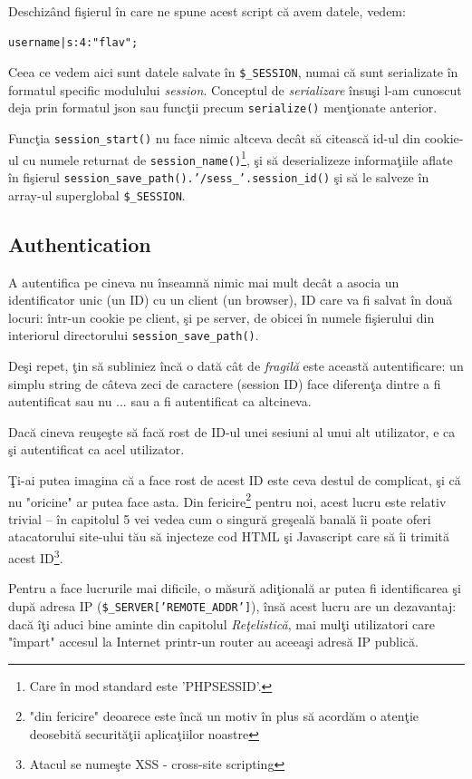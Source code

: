 Deschiz\^and fişierul \^in care ne spune acest script că avem datele, vedem:
\begin{verbatim}
username|s:4:"flav";
\end{verbatim}
Ceea ce vedem aici sunt datele salvate \^in \texttt{\$\_SESSION}, numai că
sunt serializate \^in formatul specific modulului \textit{session}. Conceptul
de \textsl{serializare} \^insuşi l-am cunoscut deja prin formatul json sau funcţii
precum \texttt{serialize()} menţionate anterior.

Funcţia \texttt{session\_start()} nu face nimic altceva dec\^at să citească id-ul
din cookie-ul cu numele returnat de \texttt{session\_name()}\footnote{Care \^in mod
standard este 'PHPSESSID'.}, şi să deserializeze informaţiile aflate \^in fişierul
\texttt{session\_save\_path().'/sess\_'.session\_id()}
şi să le salveze \^in
array-ul superglobal \texttt{\$\_SESSION}.

\subsection{Authentication}
A autentifica pe cineva nu înseamnă nimic mai mult decât a asocia
un identificator unic (un ID) cu un client (un browser), ID
care va fi salvat în două locuri: într-un cookie pe client, şi pe
server, de obicei în numele fişierului din interiorul directorului
\texttt{session\_save\_path()}.

Deşi repet, ţin să subliniez încă o dată cât de \textit{fragilă} este această
autentificare: un simplu string de câteva zeci de caractere
(session ID) face diferenţa dintre a fi autentificat sau nu ... sau
a fi autentificat ca altcineva.

Dacă cineva reuşeşte să facă rost de ID-ul unei sesiuni al unui
alt utilizator, e ca şi autentificat ca acel utilizator.

Ţi-ai putea imagina că a face rost de acest ID este ceva destul de
complicat, şi că nu "oricine" ar putea face asta. Din fericire\footnote{"din
fericire" deoarece este încă un motiv în plus să acordăm o atenţie
deosebită securităţii aplicaţiilor noastre} pentru noi, acest lucru este
relativ trivial  -- în capitolul 5 vei vedea cum o singură greşeală
banală îi poate oferi atacatorului site-ului tău să injecteze cod HTML
şi Javascript care să îi trimită acest ID\footnote{Atacul se numeşte
XSS - cross-site scripting}.

Pentru a face lucrurile mai dificile, o măsură adiţională ar putea
fi identificarea şi după adresa IP (\texttt{\$\_SERVER['REMOTE\_ADDR']}),
însă acest lucru are un dezavantaj: dacă îţi aduci bine aminte din
capitolul \textit{Reţelistică}, mai mulţi utilizatori care "împart"
accesul la Internet printr-un router au aceeaşi adresă IP publică.

